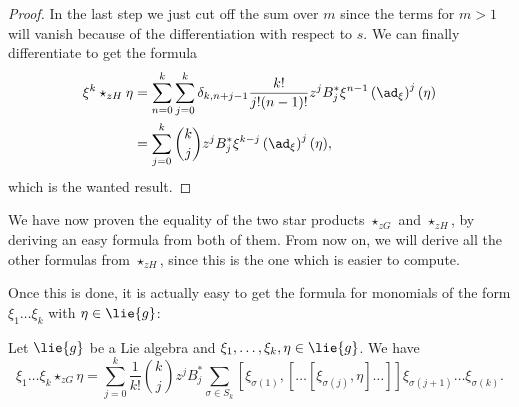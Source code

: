 \begin{proof}
    In the last step we just cut off the sum over $m$ since the terms
    for $m >1$ will vanish because of the differentiation with respect
    to $s$. We can finally differentiate to get the formula
    \begin{align*}
        \xi^k \star_{zH} \eta
        & =
        \sum\limits_{n=0}^k
        \sum\limits_{j=0}^k
        \delta_{k, n + j - 1}
        \frac{k!}{j! (n - 1)!}
        z^j B_j^*
        \xi^{n - 1}
        \left(\ad_{\xi}\right)^j
        (\eta)
        \\
        & =
        \sum\limits_{j=0}^k
        \binom{k}{j}
        z^j B_j^*
        \xi^{k - j}
        \left( \ad_{\xi} \right)^j
        (\eta),
    \end{align*}
    which is the wanted result.
\end{proof}
\begin{remark}
    We have now proven the equality of the two star products 
    $\star_{zG}$ and $\star_{zH}$, by deriving an easy formula from both 
    of them. From now on, we will derive all the other formulas from $
    \star_{zH}$, since this is the one which is easier to compute.
\end{remark}
Once this is done, it is actually easy to get the formula for
monomials of the form $\xi_1 \ldots \xi_k$ with $\eta \in \lie{g}$:
\begin{proposition}
	\label{Prop:Formulas:LinearMonomial2}
    Let $\lie{g}$ be a Lie algebra and $\xi_1, \ldots, \xi_k, \eta \in 
    \lie{g}$. We have
    \begin{equation}\label{Formulas:LinearMonomial2}
    	\xi_1 \ldots \xi_k \star_{zG} \eta
    	=
    	\sum\limits_{j=0}^k
    	\frac{1}{k!} \binom{k}{j}
    	z^j B_j^*
    	\sum\limits_{\sigma \in S_k}
    	[\xi_{\sigma(1)}, 
    		[ \ldots [\xi_{\sigma(j)}, \eta] \ldots ]
    	]
    	\xi_{\sigma(j+1)} \ldots \xi_{\sigma(k)}.
    \end{equation}
\end{proposition}
